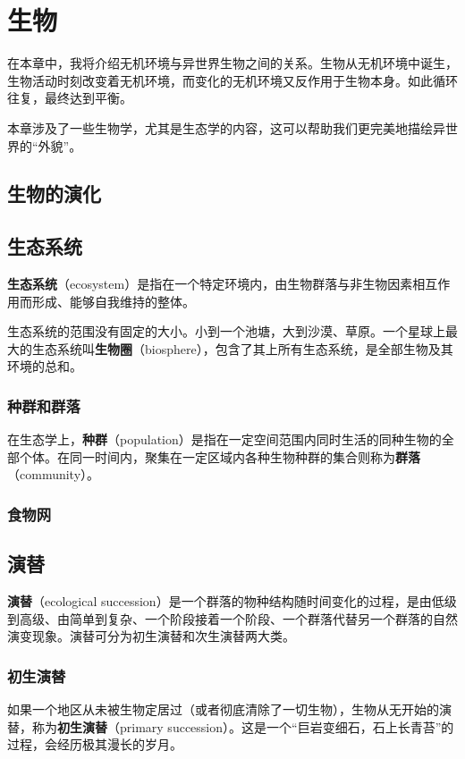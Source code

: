 \chapter{生物}
在本章中，我将介绍无机环境与异世界生物之间的关系。生物从无机环境中诞生，生物活动时刻改变着无机环境，而变化的无机环境又反作用于生物本身。如此循环往复，最终达到平衡。

本章涉及了一些生物学，尤其是生态学的内容，这可以帮助我们更完美地描绘异世界的“外貌”。

\section{生物的演化}

\section{生态系统}
\textbf{生态系统}（ecosystem）是指在一个特定环境内，由生物群落与非生物因素相互作用而形成、能够自我维持的整体。

生态系统的范围没有固定的大小。小到一个池塘，大到沙漠、草原。一个星球上最大的生态系统叫\textbf{生物圈}（biosphere），包含了其上所有生态系统，是全部生物及其环境的总和。

\subsection{种群和群落}
在生态学上，\textbf{种群}（population）是指在一定空间范围内同时生活的同种生物的全部个体。在同一时间内，聚集在一定区域内各种生物种群的集合则称为\textbf{群落}（community）。

\subsection{食物网}

\section{演替}
\textbf{演替}（ecological succession）是一个群落的物种结构随时间变化的过程，是由低级到高级、由简单到复杂、一个阶段接着一个阶段、一个群落代替另一个群落的自然演变现象。演替可分为初生演替和次生演替两大类。

\subsection{初生演替}
如果一个地区从未被生物定居过（或者彻底清除了一切生物），生物从无开始的演替，称为\textbf{初生演替}（primary succession）。这是一个“巨岩变细石，石上长青苔”的过程，会经历极其漫长的岁月。

